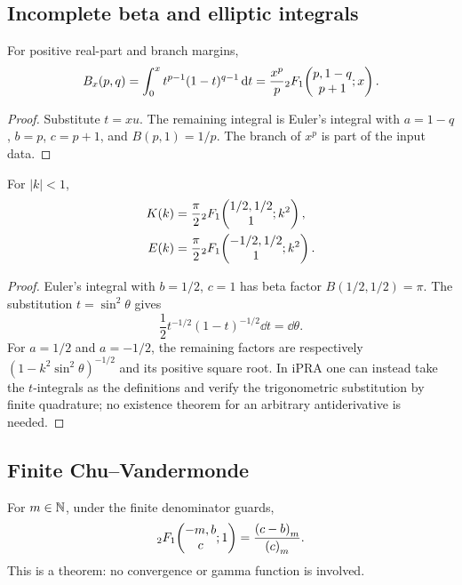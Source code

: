 \subsection{Incomplete beta and elliptic integrals}

\begin{corollary}\label{cor:incomplete-beta}
For positive real-part and branch margins,
\begin{equation}\label{eq:incomplete-beta}
 B_x(p,q)=\int_0^x t^{p-1}(1-t)^{q-1}\,\mathrm d t
 =\frac{x^p}{p}{}_2F_1\!\left(\begin{matrix}p,1-q\\p+1\end{matrix};x\right).
\end{equation}
\end{corollary}

\begin{proof}
Substitute \(t=xu\).  The remaining integral is Euler's integral with
\(a=1-q\), \(b=p\), \(c=p+1\), and
\(B(p,1)=1/p\).  The branch of \(x^p\) is part of the input data.
\end{proof}

\begin{corollary}\label{cor:elliptic}
For \(|k|<1\),
\begin{align}
 K(k)&=\frac\pi2{}_2F_1\!\left(\begin{matrix}1/2,1/2\\1\end{matrix};k^2\right),\label{eq:elliptic-K}\\
 E(k)&=\frac\pi2{}_2F_1\!\left(\begin{matrix}-1/2,1/2\\1\end{matrix};k^2\right).
 \label{eq:elliptic-E}
\end{align}
\end{corollary}

\begin{proof}
Euler's integral with \(b=1/2\), \(c=1\) has beta factor
\(B(1/2,1/2)=\pi\).  The substitution \(t=\sin^2\theta\) gives
\[
 \frac12t^{-1/2}(1-t)^{-1/2}\dd t=\dd\theta.
\]
For \(a=1/2\) and \(a=-1/2\), the remaining factors are respectively
\((1-k^2\sin^2\theta)^{-1/2}\) and its positive square root.  In iPRA one can
instead take the \(t\)-integrals as the definitions and verify the
trigonometric substitution by finite quadrature; no existence theorem for an
arbitrary antiderivative is needed.
\end{proof}

\subsection{Finite Chu--Vandermonde}

\begin{theorem}\label{thm:vandermonde}
For \(m\in\mathbb N\), under the finite denominator guards,
\begin{equation}\label{eq:vandermonde}
 {}_2F_1\!\left(\begin{matrix}-m,b\\c\end{matrix};1\right)=\frac{\left(c-b\right)_{m}}{\left(c\right)_{m}}.
\end{equation}
This is a \StatusA{} theorem: no convergence or gamma function is involved.
\end{theorem}

